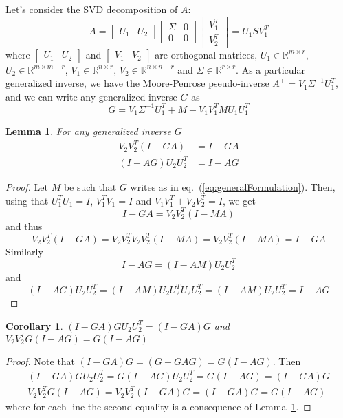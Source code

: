 \documentclass[]{article}
\newtheorem{corollary}[theorem]{Corollary}
\newtheorem{lemma}[theorem]{Lemma}
\theoremstyle{definition}
\newcommand{\BIN}{\begin{bmatrix}}
\newcommand{\BOUT}{\end{bmatrix}}
\begin{document}
Let's consider the SVD decomposition of $A$:
\begin{equation*}
  A = \BIN U_1 & U_2 \BOUT \BIN \Sigma & 0 \\ 0 & 0 \BOUT \BIN V_1^T \\ V_2^T \BOUT = U_1 S V_1^T
\end{equation*}
where $\BIN U_1 & U_2 \BOUT$ and $\BIN V_1 & V_2 \BOUT$ are orthogonal matrices, $U_1 \in \mathbb{R}^{m \times r}$, $U_2 \in \mathbb{R}^{m \times m-r}$, $V_1 \in \mathbb{R}^{n \times r}$, $V_2 \in \mathbb{R}^{n \times n-r}$ and $\Sigma \in \mathbb{R}^{r \times r}$. As a particular generalized inverse, we have the Moore-Penrose pseudo-inverse $A^+ = V_1 \Sigma^{-1} U_1^T$, and we can write any generalized inverse $G$ as
\begin{equation}
  G = V_1 \Sigma^{-1} U_1^T + M - V_1 V_1^T M U_1 U_1^T \label{eq:generalFormulation}
\end{equation}

\begin{lemma}
\label{lemma:projection}
For any generalized inverse $G$
	\begin{align*}
	V_2 V_2^T (I-GA) &= I-GA\\
	(I-AG)U_2U_2^T &= I-AG
	\end{align*}
\end{lemma}
\begin{proof}
Let $M$ be such that $G$ writes as in eq.~(\ref{eq:generalFormulation}). Then, using that $U_1^T U_1 = I$, $V_1^T V_1 = I$ and $V_1 V_1^T + V_2 V_2^T = I$, we get
\begin{equation*}
  I-GA = V_2 V_2^T (I-MA)
\end{equation*}
and thus
\begin{equation*}
  V_2 V_2^T (I-GA) = V_2 V_2^T V_2 V_2^T (I-MA) = V_2 V_2^T (I-MA) = I - GA
\end{equation*}
Similarly
\begin{equation*}
  I-AG = (I-AM)U_2 U_2^T
\end{equation*}
and
\begin{equation*}
  (I-AG)U_2 U_2^T = (I-AM)U_2 U_2^T U_2 U_2^T = (I-AM)U_2 U_2^T  = I-AG
\end{equation*}
\end{proof}

\begin{corollary}
\label{co:projection}
$(I-GA)G U_2 U_2^T = (I-GA)G$ and $V_2 V_2^T G(I-AG) = G(I-AG)$
\end{corollary}
\begin{proof}
Note that $(I-GA)G = (G - GAG) = G(I-AG)$. Then
\begin{align*}
  (I-GA)G U_2 U_2^T = G(I-AG) U_2 U_2^T = G(I-AG) = (I-GA)G \\
	V_2 V_2^T G(I-AG) = V_2 V_2^T (I-GA)G = (I-GA)G = G(I-AG)
\end{align*}
where for each line the second equality is a consequence of Lemma~\ref{lemma:projection}.
\end{proof}
\end{document}
